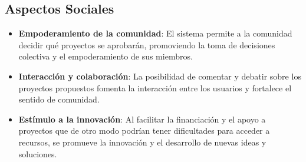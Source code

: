 \subsection{Aspectos Sociales}

\begin{itemize}
    \item \textbf{Empoderamiento de la comunidad}: El sistema permite a la comunidad decidir qué proyectos se aprobarán, promoviendo la toma de decisiones colectiva y el empoderamiento de sus miembros.
    
    \item \textbf{Interacción y colaboración}: La posibilidad de comentar y debatir sobre los proyectos propuestos fomenta la interacción entre los usuarios y fortalece el sentido de comunidad.
    
    \item \textbf{Estímulo a la innovación}: Al facilitar la financiación y el apoyo a proyectos que de otro modo podrían tener dificultades para acceder a recursos, se promueve la innovación y el desarrollo de nuevas ideas y soluciones.
\end{itemize}